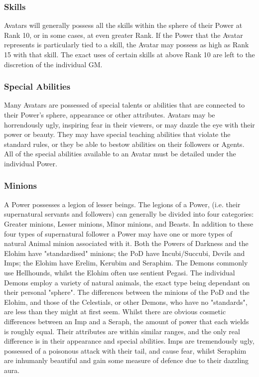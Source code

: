\subsubsection{Skills}
Avatars will generally possess all the skills within the sphere of
their Power at Rank 10, or in some cases, at even greater Rank. If the
Power that the Avatar represents is particularly tied to a skill, the
Avatar may possess as high as Rank 15 with that skill. The exact uses
of certain skills at above Rank 10 are left to the discretion of the
individual GM.

\subsubsection{Special Abilities}
Many Avatars are possessed of special talents or abilities that are
connected to their Power's sphere, appearance or other attributes.
Avatars may be horrendously ugly, inspiring fear in their viewers, or
may dazzle the eye with their power or beauty.  They may have special
teaching abilities that violate the standard rules, or they be able to
bestow abilities on their followers or Agents.  All of the special
abilities available to an Avatar must be detailed under the individual
Power.

\subsubsection{Minions}
A Power possesses a legion of lesser beings. The legions of a Power,
(i.e. their supernatural servants and followers) can generally be
divided into four categories: Greater minions, Lesser minions, Minor
minions, and Beasts.  In addition to these four types of supernatural
follower a Power may have one or more types of natural Animal minion
associated with it. Both the Powers of Darkness and the Elohim have
"standardised" minions; the PoD have Incubi/Succubi, Devils and Imps;
the Elohim have Erelim, Kerubim and Seraphim. The Demons commonly use
Hellhounds, whilst the Elohim often use sentient Pegasi. The
individual Demons employ a variety of natural animals, the exact type
being dependant on their personal "sphere".  The differences between
the minions of the PoD and the Elohim, and those of the Celestials, or
other Demons, who have no "standards", are less than they might at
first seem.  Whilst there are obvious cosmetic differences between an
Imp and a Seraph, the amount of power that each wields is roughly
equal. Their attributes are within similar ranges, and the only real
difference is in their appearance and special abilities.  Imps are
tremendously ugly, possessed of a poisonous attack with their tail,
and cause fear, whilst Seraphim are inhumanly beautiful and gain some
measure of defence due to their dazzling aura.

